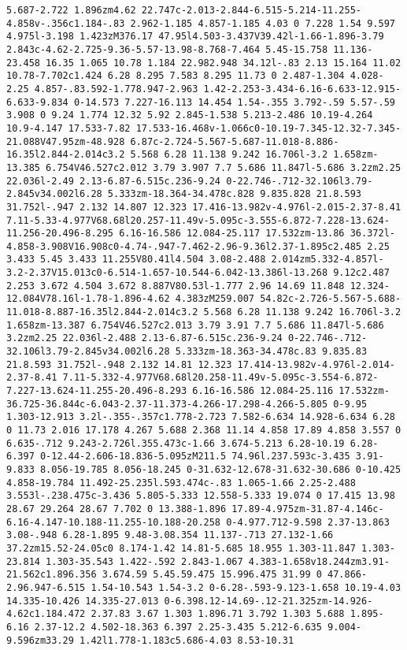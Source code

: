 \documentclass[11pt]{article}
\begin{document}
\begin{Verbatim}[commandchars=\\\{\}]
5.687-2.722 1.896zm4.62 22.747c-2.013-2.844-6.515-5.214-11.255-4.858v-.356c1.184-.83 2.962-1.185 4.857-1.185 4.03 0 7.228 1.54 9.597 4.975l-3.198 1.423zM376.17 47.95l4.503-3.437V39.42l-1.66-1.896-3.79 2.843c-4.62-2.725-9.36-5.57-13.98-8.768-7.464 5.45-15.758 11.136-23.458 16.35 1.065 10.78 1.184 22.982.948 34.12l-.83 2.13 15.164 11.02 10.78-7.702c1.424 6.28 8.295 7.583 8.295 11.73 0 2.487-1.304 4.028-2.25 4.857-.83.592-1.778.947-2.963 1.42-2.253-3.434-6.16-6.633-12.915-6.633-9.834 0-14.573 7.227-16.113 14.454 1.54-.355 3.792-.59 5.57-.59 3.908 0 9.24 1.774 12.32 5.92 2.845-1.538 5.213-2.486 10.19-4.264 10.9-4.147 17.533-7.82 17.533-16.468v-1.066c0-10.19-7.345-12.32-7.345-21.088V47.95zm-48.928 6.87c-2.724-5.567-5.687-11.018-8.886-16.35l2.844-2.014c3.2 5.568 6.28 11.138 9.242 16.706l-3.2 1.658zm-13.385 6.754V46.527c2.012 3.79 3.907 7.7 5.686 11.847l-5.686 3.2zm2.25 22.036l-2.49 2.13-6.87-6.515c.236-9.24 0-22.746-.712-32.106l3.79-2.845v34.002l6.28 5.333zm-18.364-34.478c.828 9.835.828 21.8.593 31.752l-.947 2.132 14.807 12.323 17.416-13.982v-4.976l-2.015-2.37-8.41 7.11-5.33-4.977V68.68l20.257-11.49v-5.095c-3.555-6.872-7.228-13.624-11.256-20.496-8.295 6.16-16.586 12.084-25.117 17.532zm-13.86 36.372l-4.858-3.908V16.908c0-4.74-.947-7.462-2.96-9.36l2.37-1.895c2.485 2.25 3.433 5.45 3.433 11.255V80.41l4.504 3.08-2.488 2.014zm5.332-4.857l-3.2-2.37V15.013c0-6.514-1.657-10.544-6.042-13.386l-13.268 9.12c2.487 2.253 3.672 4.504 3.672 8.887V80.53l-1.777 2.96 14.69 11.848 12.324-12.084V78.16l-1.78-1.896-4.62 4.383zM259.007 54.82c-2.726-5.567-5.688-11.018-8.887-16.35l2.844-2.014c3.2 5.568 6.28 11.138 9.242 16.706l-3.2 1.658zm-13.387 6.754V46.527c2.013 3.79 3.91 7.7 5.686 11.847l-5.686 3.2zm2.25 22.036l-2.488 2.13-6.87-6.515c.236-9.24 0-22.746-.712-32.106l3.79-2.845v34.002l6.28 5.333zm-18.363-34.478c.83 9.835.83 21.8.593 31.752l-.948 2.132 14.81 12.323 17.414-13.982v-4.976l-2.014-2.37-8.41 7.11-5.332-4.977V68.68l20.258-11.49v-5.095c-3.554-6.872-7.227-13.624-11.255-20.496-8.293 6.16-16.586 12.084-25.116 17.532zm-36.725-36.844c-6.043-2.37-11.373-4.266-17.298-4.266-5.805 0-9.95 1.303-12.913 3.2l-.355-.357c1.778-2.723 7.582-6.634 14.928-6.634 6.28 0 11.73 2.016 17.178 4.267 5.688 2.368 11.14 4.858 17.89 4.858 3.557 0 6.635-.712 9.243-2.726l.355.473c-1.66 3.674-5.213 6.28-10.19 6.28-6.397 0-12.44-2.606-18.836-5.095zM211.5 74.96l.237.593c-3.435 3.91-9.833 8.056-19.785 8.056-18.245 0-31.632-12.678-31.632-30.686 0-10.425 4.858-19.784 11.492-25.235l.593.474c-.83 1.065-1.66 2.25-2.488 3.553l-.238.475c-3.436 5.805-5.333 12.558-5.333 19.074 0 17.415 13.98 28.67 29.264 28.67 7.702 0 13.388-1.896 17.89-4.975zm-31.87-4.146c-6.16-4.147-10.188-11.255-10.188-20.258 0-4.977.712-9.598 2.37-13.863 3.08-.948 6.28-1.895 9.48-3.08.354 11.137-.713 27.132-1.66 37.2zm15.52-24.05c0 8.174-1.42 14.81-5.685 18.955 1.303-11.847 1.303-23.814 1.303-35.543 1.422-.592 2.843-1.067 4.383-1.658v18.244zm3.91-21.562c1.896.356 3.674.59 5.45.59.475 15.996.475 31.99 0 47.866-2.96.947-6.515 1.54-10.543 1.54-3.2 0-6.28-.593-9.123-1.658 10.19-4.03 14.335-10.426 14.335-27.013 0-6.398.12-14.69-.12-21.325zm-14.926-4.62c1.184.472 2.37.83 3.67 1.303 1.896.71 3.792 1.303 5.688 1.895-6.16 2.37-12.2 4.502-18.363 6.397 2.25-3.435 5.212-6.635 9.004-9.596zm33.29 1.42l1.778-1.183c5.686-4.03 8.53-10.31 
\end{Verbatim}
\end{document}
